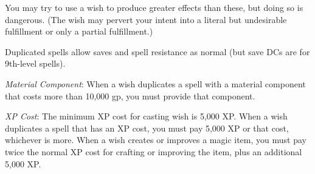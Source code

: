 {	You may try to use a wish to produce greater effects than these, but doing so is dangerous. (The wish may pervert your intent into a literal but undesirable fulfillment or only a partial fulfillment.)

	Duplicated spells allow saves and spell resistance as normal (but save DCs are for 9th-level spells).

	\textit{Material Component}:
	When a wish duplicates a spell with a material component that costs more than 10,000 gp, you must provide that component.

	\textit{XP Cost}:
	The minimum XP cost for casting wish is 5,000 XP. When a wish duplicates a spell that has an XP cost, you must pay 5,000 XP or that cost, whichever is more. When a wish creates or improves a magic item, you must pay twice the normal XP cost for crafting or improving the item, plus an additional 5,000 XP.

}
